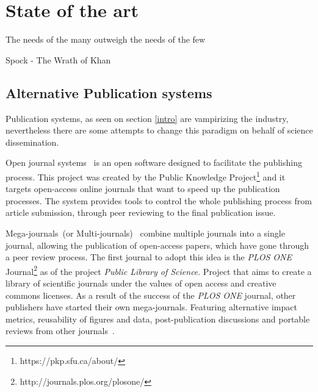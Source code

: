 \chapter{State of the art}

\begin{FraseCelebre}
  \begin{Frase}
    The needs of the many outweigh the needs of the few
  \end{Frase}
  \begin{Fuente}
    Spock - The Wrath of Khan
  \end{Fuente}
\end{FraseCelebre}




\section{Alternative Publication systems}

Publication systems, as seen on section \ref{intro} are vampirizing the
industry, nevertheless there are some attempts to change this paradigm on behalf
of science dissemination.

Open journal systems~\cite{willinsky2005open} is an open software designed to
facilitate the publishing process. This project was created by the Public
Knowledge Project\footnote{https://pkp.sfu.ca/about/} and it targets open-access
online journals that want to speed up the publication processes. The system
provides tools to control the whole publishing process from article submission,
through peer reviewing to the final publication issue.

Mega-journals~(or Multi-journals)~\cite{binfield2013open,wellen2013open} combine
multiple journals into a single journal, allowing the publication of open-access
papers, which have gone through a peer review process. The first journal to
adopt this idea is the \emph{PLOS ONE}
Journal\footnote{http://journals.plos.org/plosone/} as of the project
\emph{Public Library of Science}. Project that aims to create a library of
scientific journals under the values of open access and creative commons
licenses. As a result of the success of the \emph{PLOS ONE} journal, other
publishers have started their own mega-journals. Featuring alternative impact
metrics, reusability of figures and data, post-publication discussions and
portable reviews from other journals~\cite{bjork2015have}.

